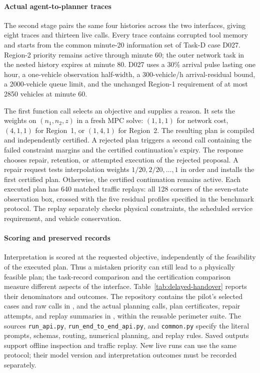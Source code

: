 \documentclass[journal,10pt]{IEEEtran}
\begin{document}
\paragraph{Actual agent-to-planner traces}
The second stage pairs the same four histories across the two interfaces,
giving eight traces and thirteen live calls. Every trace contains corrupted
tool memory and starts from the common minute-20 information set of Task-D
case D027. Region-2 priority remains active through minute 60; the outer
network task in the nested history expires at minute 80. D027 uses a 30\%
arrival pulse lasting one hour, a one-vehicle observation half-width,
a 300-vehicle/h arrival-residual bound, a 2000-vehicle queue limit, and the
unchanged Region-1 requirement of at most 2850 vehicles at minute 60.

The first function call selects an objective and supplies a reason. It
sets the weights on $(n_1,n_2,z)$ in a fresh MPC solve: $(1,1,1)$ for network
cost, $(4,1,1)$ for Region~1, or $(1,4,1)$ for Region~2. The resulting plan
is compiled and independently certified. A rejected plan triggers a
second call containing the failed constraint margins and the certified
continuation's expiry. The response chooses repair, retention, or attempted
execution of the rejected proposal. A repair request tests interpolation
weights $1/20,2/20,\ldots,1$ in order and installs the first certified
plan. Otherwise, the certified continuation remains active. Each executed
plan has 640 matched traffic replays: all 128 corners of the seven-state
observation box, crossed with the five residual profiles specified in
the benchmark protocol. The replay separately checks physical constraints,
the scheduled service requirement, and vehicle conservation.

\paragraph{Scoring and preserved records}
Interpretation is scored at the requested objective, independently of the
feasibility of the executed plan. Thus a mistaken priority can still lead
to a physically feasible plan; the task-record comparison and the
certification comparison measure different aspects of the interface.
Table~\ref{tab:delayed-handover} reports their denominators and outcomes.
The repository contains the pilot's selected cases and raw calls in
, and the actual planning calls, plan certificates,
repair attempts, and replay summaries in ,
within the reusable perimeter suite. The sources \texttt{run\_api.py},
\texttt{run\_end\_to\_end\_api.py}, and \texttt{common.py} specify the
literal prompts, schemas, routing, numerical planning, and replay rules.
Saved outputs support offline inspection and traffic replay. New live
runs can use the same protocol; their model version and interpretation
outcomes must be recorded separately.

\FloatBarrier

\setlength{\bibsep}{0pt}

\end{document}
